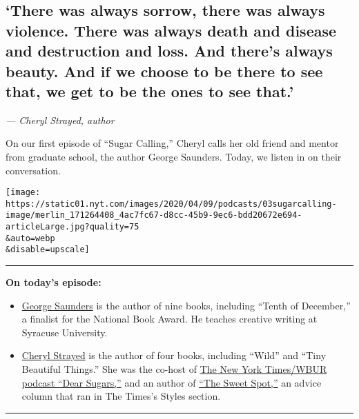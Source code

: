 \hypertarget{there-was-always-sorrow-there-was-always-violence-there-was-always-death-and-disease-and-destruction-and-loss-and-theres-always-beauty-and-if-we-choose-to-be-there-to-see-that-we-get-to-be-the-ones-to-see-that}{%
\subsection{`There was always sorrow, there was always violence. There
was always death and disease and destruction and loss. And there's
always beauty. And if we choose to be there to see that, we get to be
the ones to see
that.'}\label{there-was-always-sorrow-there-was-always-violence-there-was-always-death-and-disease-and-destruction-and-loss-and-theres-always-beauty-and-if-we-choose-to-be-there-to-see-that-we-get-to-be-the-ones-to-see-that}}

\emph{--- Cheryl Strayed, author}

On our first episode of ``Sugar Calling,'' Cheryl calls her old friend
and mentor from graduate school, the author George Saunders. Today, we
listen in on their conversation.

\texttt{[image: https://static01.nyt.com/images/2020/04/09/podcasts/03sugarcalling-image/merlin\_171264408\_4ac7fc67-d8cc-45b9-9ec6-bdd20672e694-articleLarge.jpg?quality=75\\\&auto=webp\\\&disable=upscale]}

\begin{center}\rule{0.5\linewidth}{\linethickness}\end{center}

\textbf{On today's episode:}

\begin{itemize}
\item
  \href{http://www.georgesaundersbooks.com/}{George Saunders} is the
  author of nine books, including ``Tenth of December,'' a finalist for
  the National Book Award. He teaches creative writing at Syracuse
  University.
\item
  \href{http://www.cherylstrayed.com/}{Cheryl Strayed} is the author of
  four books, including ``Wild'' and ``Tiny Beautiful Things.'' She was
  the co-host of \href{https://www.nytimes.com/column/dear-sugars}{The
  New York Times/WBUR podcast ``Dear Sugars,''} and an author of
  \href{https://www.nytimes.com/column/the-sweet-spot}{``The Sweet
  Spot,''} an advice column that ran in The Times's Styles section.
\end{itemize}

\begin{center}\rule{0.5\linewidth}{\linethickness}\end{center}

